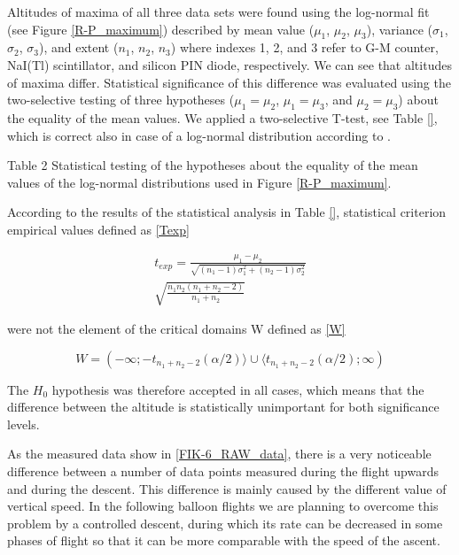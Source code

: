 \documentclass{Rpd}
\begin{document}
Altitudes of maxima of all three data sets were found using the log-normal fit (see Figure \ref{R-P_maximum}) described by mean value ($\mu_1$, $\mu_2$, $\mu_3$), variance ($\sigma_1$, $\sigma_2$, $\sigma_3$), and extent ($n_1$, $n_2$, $n_3$) where indexes 1, 2, and 3 refer to G-M counter, NaI(Tl) scintillator, and silicon PIN diode, respectively. We can see that altitudes of maxima differ. Statistical significance of this difference was evaluated using the two-selective testing of three hypotheses ($\mu_1 = \mu_2$, $\mu_1 = \mu_3$, and $\mu_2 = \mu_3$) about the equality of the mean values. We applied a two-selective T-test, see Table \ref{}, which is correct also in case of a log-normal distribution according to \cite{confidence_intervals}.

Table 2 Statistical testing of the hypotheses about the equality of the mean values of the log-normal distributions used in Figure \ref{R-P_maximum}. 


According to the results of the statistical analysis in Table \ref{}, statistical criterion empirical values defined as \ref{Texp}

\begin{equation}
\begin{gathered}
t_{exp} =  \frac{\mu_1 - \mu_2}{\sqrt{(n_1 - 1)\sigma_1 ^2 + (n_2 - 1)\sigma_2 ^2}} \\
 \sqrt{\frac{n_1 n_2 (n_1 + n_2 -2)}{n_1 + n_2}}
\end{gathered}
\end{equation}\label{Texp}

were not the element of the critical domains W defined as \ref{W} 

\begin{equation}W = (- \infty ; -t_{n_1 + n_2 -2} (\alpha / 2) \rangle \cup \langle t_{n_1 + n_2 -2} (\alpha / 2); \infty)  \end{equation}\label{W}

The $H_0$ hypothesis was therefore accepted in all cases, which means that the difference between the altitude is statistically unimportant for both significance levels.

As the measured data show in \ref{FIK-6_RAW_data}, there is a very noticeable difference between a number of data points measured during the flight upwards and during the descent. This difference is mainly caused by the  different value of vertical speed. In the following balloon flights we are planning to overcome this problem by a controlled descent, during which its rate can be decreased in some phases of flight so that it can be more comparable with the speed of the ascent.
\end{document}
